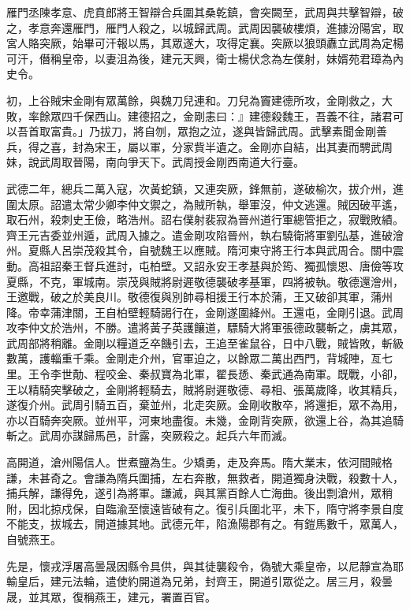 \begin{pinyinscope}
 雁門丞陳孝意、虎賁郎將王智辯合兵圍其桑乾鎮，會突闕至，武周與共擊智辯，破之，孝意奔還雁門，雁門人殺之，以城歸武周。武周因襲破樓煩，進據汾陽宮，取宮人賂突厥，始畢可汗報以馬，其眾遂大，攻得定襄。突厥以狼頭纛立武周為定楊可汗，僭稱皇帝，以妻沮為後，建元天興，衛士楊伏念為左僕射，妹婿苑君璋為內史令。



 初，上谷賊宋金剛有眾萬餘，與魏刀兒連和。刀兒為竇建德所攻，金剛救之，大敗，率餘眾四千保西山。建德招之，金剛恚曰：』建德殺魏王，吾義不往，諸君可以吾首取富貴。」乃拔刀，將自刎，眾抱之泣，遂與皆歸武周。武擊素聞金剛善兵，得之喜，封為宋王，屬以軍，分家貲半遺之。金剛亦自結，出其妻而騁武周妹，說武周取晉陽，南向爭天下。武周授金剛西南道大行臺。



 武德二年，總兵二萬入寇，次黃蛇鎮，又連突厥，鋒無前，遂破榆次，拔介州，進圍太原。詔遣太常少卿李仲文禦之，為賊所執，舉軍沒，仲文逃還。賊因破平遙，取石州，殺刺史王儉，略浩州。詔右僕射裴寂為晉州道行軍總管拒之，寂戰敗績。齊王元吉委並州遁，武周入據之。遣金剛攻陷晉州，執右驍衛將軍劉弘基，進破澮州。夏縣人呂崇茂殺其令，自號魏王以應賊。隋河東守將王行本與武周合。關中震動。高祖詔秦王督兵進討，屯柏壁。又詔永安王孝基與於筠、獨孤懷恩、唐儉等攻夏縣，不克，軍城南。崇茂與賊將尉遲敬德襲破孝基軍，四將被執。敬德還澮州，王邀戰，破之於美良川。敬德復與別帥尋相援王行本於蒲，王又破卻其軍，蒲州降。帝幸蒲津關，王自柏壁輕騎謁行在，金剛遂圍絳州。王還屯，金剛引退。武周攻李仲文於浩州，不勝。遣將黃子英護饟道，驃騎大將軍張德政襲斬之，虜其眾，武周部將稍離。金剛以糧道乏卒饑引去，王追至雀鼠谷，日中八戰，賊皆敗，斬級數萬，護輜重千乘。金剛走介州，官軍迫之，以餘眾二萬出西門，背城陣，亙七里。王令李世勣、程咬金、秦叔寶為北軍，翟長愻、秦武通為南軍。既戰，小卻，王以精騎突擊破之，金剛將輕騎去，賊將尉遲敬德、尋相、張萬歲降，收其精兵，遂復介州。武周引騎五百，棄並州，北走突厥。金剛收散卒，將還拒，眾不為用，亦以百騎奔突厥。並州平，河東地盡復。未幾，金剛背突厥，欲還上谷，為其追騎斬之。武周亦謀歸馬邑，計露，突厥殺之。起兵六年而滅。



 高開道，滄州陽信人。世煮鹽為生。少矯勇，走及奔馬。隋大業末，依河間賊格謙，未甚奇之。會謙為隋兵圍捕，左右奔散，無救者，開道獨身決戰，殺數十人，捕兵解，謙得免，遂引為將軍。謙滅，與其黨百餘人亡海曲。後出剽滄州，眾稍附，因北掠戍保，自臨渝至懷遠皆破有之。復引兵圍北平，未下，隋守將李景自度不能支，拔城去，開道據其地。武德元年，陷漁陽郡有之。有鎧馬數千，眾萬人，自號燕王。



 先是，懷戎浮屠高曇晟因縣令具供，與其徒襲殺令，偽號大乘皇帝，以尼靜宣為耶輸皇后，建元法輪，遣使約開道為兄弟，封齊王，開道引眾從之。居三月，殺曇晟，並其眾，復稱燕王，建元，署置百官。




\end{pinyinscope}
